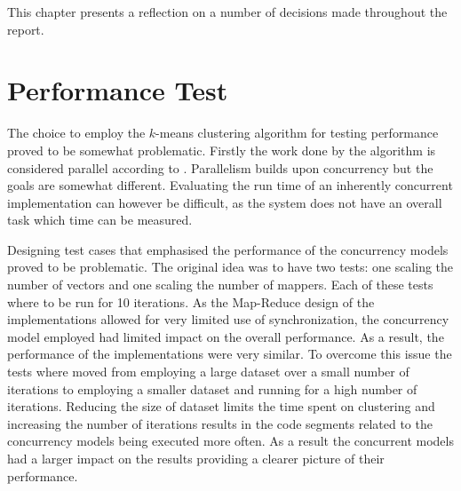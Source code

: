 \makeatletter {}\makeatother
{}
This chapter presents a reflection on a number of decisions made throughout the report.

\section{Performance Test}
The choice to employ the $k$-means clustering algorithm for testing performance proved to be somewhat problematic. Firstly the work done by the algorithm is considered parallel according to . Parallelism builds upon concurrency but the goals are somewhat different. Evaluating the run time of an inherently concurrent implementation can however be difficult, as the system does not have an overall task which time can be measured.

Designing test cases that emphasised the performance of the concurrency models proved to be problematic. The original idea was to have two tests: one scaling the number of vectors and one scaling the number of mappers. Each of these tests where to be run for 10 iterations. As the Map-Reduce design of the implementations allowed for very limited use of synchronization, the concurrency model employed had limited impact on the overall performance. As a result, the performance of the implementations were very similar. To overcome this issue the tests where moved from employing a large dataset over a small number of iterations to employing a smaller dataset and running for a high number of iterations. Reducing the size of dataset limits the time spent on clustering and increasing the number of iterations results in the code segments related to the concurrency models being executed more often. As a result the concurrent models had a larger impact on the results providing a clearer picture of their performance.

